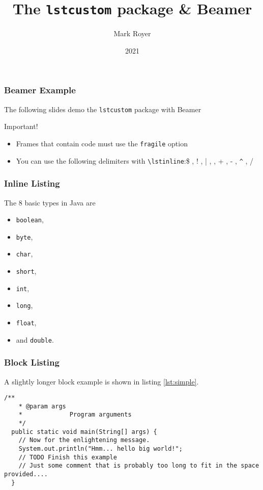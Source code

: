 \documentclass{beamer}
\title{The \texttt{lstcustom} package \& Beamer}
\author{Mark Royer}
\date{2021}
\begin{document}
\frame{\titlepage}

\begin{frame}[fragile]
  \frametitle{Beamer Example}
  
  The following slides demo the \texttt{lstcustom} package with Beamer

  \begin{alertblock}{Important!}
    \begin{itemize}
    \item Frames that contain code must use the \texttt{fragile}
      option
    \item You can use the following delimiters with
      \texttt{\textbackslash lstinline}:\newline \$ , !  , | ,
      \texttildelow , + , - , \verb=^= , /
    \end{itemize}

  \end{alertblock}
  
\end{frame}


\begin{frame}[fragile]
  \frametitle{Inline Listing}
  
  The 8 basic types in Java are
  \begin{itemize}
  \item \lstinline$boolean$,
  \item \lstinline!byte!,
  \item \lstinline|char|,
  \item \lstinline~short~,
  \item \lstinline+int+,
  \item \lstinline-long-,
  \item \lstinline^float^,
  \item and \lstinline/double/.
  \end{itemize}

\end{frame}


\begin{frame}[fragile]
  \frametitle{Block Listing}

  A slightly longer block example is shown in listing \ref{lst:simple}.

\begin{lstlisting}[caption={A simple listing.}, label={lst:simple}]
  /**
    * @param args
    *             Program arguments
    */
  public static void main(String[] args) {
    // Now for the enlightening message.
    System.out.println("Hmm... hello big world!";
    // TODO Finish this example
    // Just some comment that is probably too long to fit in the space provided....
  }
\end{lstlisting}

\end{frame}
  
\end{document}
